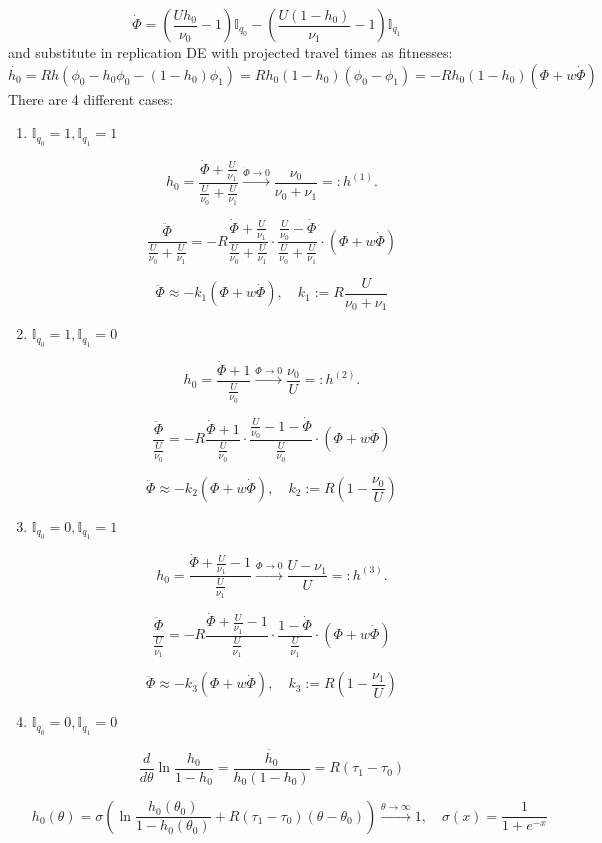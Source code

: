 \documentclass[12pt]{article}
\begin{document}
 $$ \quad \dot{\Phi} = \left(\frac{U h_0}{\nu_0} - 1 \right) \mathbb{I}_{q_0} - \left(\frac{U (1 - h_0)}{\nu_1} - 1 \right)\mathbb{I}_{q_1} $$
and substitute in replication DE with projected travel times as fitnesses:
 $$ \dot{h_0} = Rh(\phi_0 - h_0\phi_0 -(1-h_0)\phi_1) = Rh_0(1-h_0)(\phi_0 - \phi_1) = -Rh_0(1-h_0)(\Phi + w \dot{\Phi} ) $$
There are 4 different cases:
 \begin{enumerate}
 
	\item $  \mathbb{I}_{q_0} = 1,  \mathbb{I}_{q_1} = 1 $
		
	$$ h_0 = \frac{\dot{\Phi} + \frac{U}{\nu_1}}{\frac{U}{\nu_0} + \frac{U}{\nu_1}} \stackrel{\dot \Phi \to 0}{\to} \frac{\nu_0}{\nu_0 + \nu_1 } =: h^{(1)} . $$

$$ \frac{\ddot{\Phi}}{\frac{U}{\nu_0} + \frac{U}{\nu_1}} = -R \frac{\dot{\Phi} + \frac{U}{\nu_1}}{\frac{U}{\nu_0} + \frac{U}{\nu_1}} \cdot \frac{\frac{U}{\nu_0} - \dot{\Phi}}{\frac{U}{\nu_0} + \frac{U}{\nu_1}} \cdot (\Phi + w \dot{\Phi}) $$

$$ \ddot{\Phi} \approx - k_1 (\Phi + w \dot{\Phi}), \quad k_1 := R \frac{U}{\nu_0 + \nu_1} $$

 
	
	\item  $  \mathbb{I}_{q_0} = 1,  \mathbb{I}_{q_1} = 0 $
	
		$$ h_0 = \frac{\dot{\Phi} + 1}{\frac{U}{\nu_0}} \stackrel{\dot \Phi \to 0}{\to} \frac{\nu_0}{U}  =: h^{(2)} . $$

$$ \frac{\ddot{\Phi}}{\frac{U}{\nu_0} } = -R \frac{\dot{\Phi} + 1}{\frac{U}{\nu_0} } \cdot \frac{\frac{U}{\nu_0} - 1 - \dot{\Phi}}{{\frac{U}{\nu_0} }} \cdot (\Phi + w \dot{\Phi}) $$

$$ \ddot{\Phi} \approx - k_2 (\Phi + w \dot{\Phi}), \quad k_2 := R( 1 -\frac{\nu_0}{U}) $$

	\item  $  \mathbb{I}_{q_0} = 0,  \mathbb{I}_{q_1} = 1 $
	
		$$ h_0 = \frac{\dot{\Phi} + \frac{U}{\nu_1} - 1}{\frac{U}{\nu_1}} \stackrel{\dot \Phi \to 0}{\to} \frac{U - \nu_1}{U}  =: h^{(3)} . $$

$$ \frac{\ddot{\Phi}}{\frac{U}{\nu_1} } = -R \frac{\dot{\Phi} + \frac{U}{\nu_1} - 1}{\frac{U}{\nu_1}} \cdot \frac{ 1 - \dot{\Phi}}{{\frac{U}{\nu_1} }} \cdot (\Phi + w \dot{\Phi}) $$

$$ \ddot{\Phi} \approx - k_3 (\Phi + w \dot{\Phi}), \quad k_3 := R( 1 -\frac{\nu_1}{U}) $$

	\item  $  \mathbb{I}_{q_0} = 0,  \mathbb{I}_{q_1} = 0 $ 
	
	$$ \frac{d}{d\theta} \ln \frac{h_0}{1-h_0} = \frac{\dot{h_0}}{h_0 (1-h_0)} = R(\tau_1 - \tau_0)$$
	
	$$ h_0(\theta) = \sigma \left( \ln \frac{h_0(\theta_0)}{1 - h_0(\theta_0)} + R(\tau_1 - \tau_0)(\theta - \theta_0) \right) \stackrel{\theta \to  \infty}{\to} 1, \quad \sigma(x) = \frac{1}{1 + e^{-x}}$$
 
 \end{enumerate}
\end{document}
